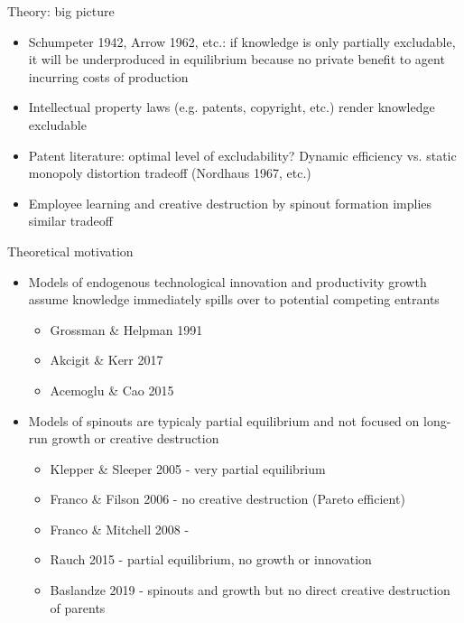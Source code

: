 \documentclass[english,usenames,dvipsnames]{beamer}
\begin{document}
\begin{frame}{Theory: big picture}
\label{theory_big_picture}
\begin{itemize}
	\item Schumpeter 1942, Arrow 1962, etc.: if knowledge is only partially excludable, it will be underproduced in equilibrium because no private benefit to agent incurring costs of production
	\item Intellectual property laws (e.g. patents, copyright, etc.) render knowledge excludable
	\item Patent literature: optimal level of excludability? Dynamic efficiency vs. static monopoly distortion tradeoff (Nordhaus 1967, etc.)
	\item Employee learning and creative destruction by spinout formation implies similar tradeoff
\end{itemize}
\end{frame}


\begin{frame}{Theoretical motivation}
\begin{itemize}
	\item Models of endogenous technological innovation and productivity growth assume knowledge immediately spills over to potential competing entrants
	\begin{itemize}
		\item Grossman \& Helpman 1991 
		\item Akcigit \& Kerr 2017
		\item Acemoglu \& Cao 2015
	\end{itemize}
	\item Models of spinouts are typicaly partial equilibrium and not focused on long-run growth or creative destruction
	\begin{itemize}
		\item Klepper \& Sleeper 2005 - very partial equilibrium 
		\item Franco \& Filson 2006 - no creative destruction  (Pareto efficient)
		\item Franco \& Mitchell 2008 - 
		\item Rauch 2015 - partial equilibrium, no growth or innovation
		\item Baslandze 2019 - spinouts and growth but no direct creative destruction of parents
	\end{itemize}
\end{itemize}
\end{frame}
\end{document}
